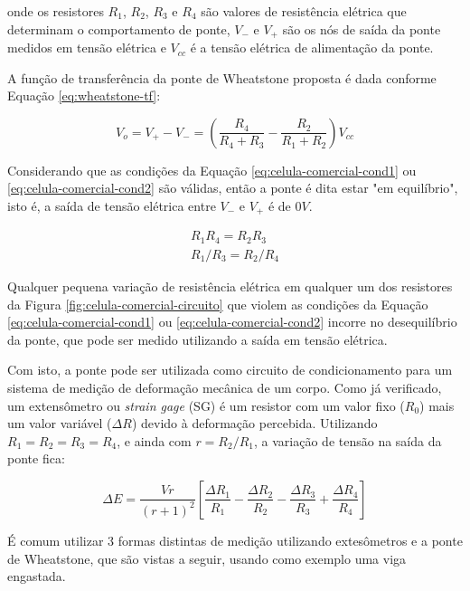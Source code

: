 \documentclass[a4paper]{instrumentacao}
\begin{document}
\noindent onde os resistores $R_1$, $R_2$, $R_3$ e $R_4$ são valores de resistência elétrica que determinam o comportamento de ponte, $V_-$ e $V_+$ são os nós de saída da ponte medidos em tensão elétrica e $V_{cc}$ é a tensão elétrica de alimentação da ponte.

A função de transferência da ponte de Wheatstone proposta é dada conforme Equação \ref{eq:wheatstone-tf}:

\begin{equation}
	V_o = V_+ - V_- = \left(\dfrac{R_4}{R_4 + R_3} - \dfrac{R_2}{R_1 + R_2}\right)V_{cc}
	\label{eq:wheatstone-tf}
\end{equation}

Considerando que as condições da Equação \ref{eq:celula-comercial-cond1} ou \ref{eq:celula-comercial-cond2} são válidas, então a ponte é dita estar "em equilíbrio", isto é, a saída de tensão elétrica entre $V_-$ e $V_+$ é de $0V$.

\begin{eqnarray}
	R_1 R_4 = R_2 R_3 \label{eq:celula-comercial-cond1} \\
	R_1/R_3 = R_2/R_4 \label{eq:celula-comercial-cond2}
\end{eqnarray} 

Qualquer pequena variação de resistência elétrica em qualquer um dos resistores da Figura \ref{fig:celula-comercial-circuito} que violem as condições da Equação \ref{eq:celula-comercial-cond1} ou \ref{eq:celula-comercial-cond2} incorre no desequilíbrio da ponte, que pode ser medido utilizando a saída em tensão elétrica.

Com isto, a ponte pode ser utilizada como circuito de condicionamento para um sistema de medição de deformação mecânica de um corpo. Como já verificado, um extensômetro ou \textit{strain gage} (SG) é um resistor com um valor fixo ($R_0$) mais um valor variável ($\Delta R$) devido à deformação percebida. Utilizando $R_1=R_2=R_3=R_4$, e ainda com $r=R_2/R_1$, a variação de tensão na saída da ponte fica:

\begin{equation}
	\Delta E=\frac{V r}{(r+1)^2}\left [ \frac{\Delta R_1}{R_1}-\frac{\Delta R_2}{R_2}-\frac{\Delta R_3}{R_3}+\frac{\Delta R_4}{R_4} \right ]
	\label{eq:wheatstone-deltaE}
\end{equation}

É comum utilizar 3 formas distintas de medição utilizando extesômetros e a ponte de Wheatstone, que são vistas a seguir, usando como exemplo uma viga engastada.
\end{document}
